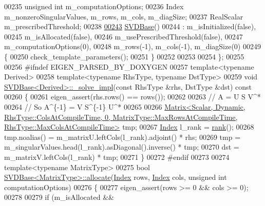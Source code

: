 \begin{DoxyCode}
00235   \textcolor{keywordtype}{unsigned} \textcolor{keywordtype}{int} m\_computationOptions;
00236   Index m\_nonzeroSingularValues, m\_rows, m\_cols, m\_diagSize;
00237   RealScalar m\_prescribedThreshold;
00238 
\hyperlink{group___s_v_d___module_abed06fc6f4b743e1f76a7b317539da87}{00243}   \hyperlink{group___s_v_d___module_abed06fc6f4b743e1f76a7b317539da87}{SVDBase}()
00244     : m\_isInitialized(false),
00245       m\_isAllocated(false),
00246       m\_usePrescribedThreshold(false),
00247       m\_computationOptions(0),
00248       m\_rows(-1), m\_cols(-1), m\_diagSize(0)
00249   \{
00250     check\_template\_parameters();
00251   \}
00252 
00253 
00254 \};
00255 
00256 \textcolor{preprocessor}{#ifndef EIGEN\_PARSED\_BY\_DOXYGEN}
00257 \textcolor{keyword}{template}<\textcolor{keyword}{typename} Derived>
00258 \textcolor{keyword}{template}<\textcolor{keyword}{typename} RhsType, \textcolor{keyword}{typename} DstType>
00259 \textcolor{keywordtype}{void} \hyperlink{group___s_v_d___module_class_eigen_1_1_s_v_d_base}{SVDBase<Derived>::\_solve\_impl}(\textcolor{keyword}{const} RhsType &rhs, DstType &dst)\textcolor{keyword}{ const}
00260 \textcolor{keyword}{}\{
00261   eigen\_assert(rhs.rows() == rows());
00262 
00263   \textcolor{comment}{// A = U S V^*}
00264   \textcolor{comment}{// So A^\{-1\} = V S^\{-1\} U^*}
00265 
00266   
      \hyperlink{group___core___module_class_eigen_1_1_matrix}{Matrix<Scalar, Dynamic, RhsType::ColsAtCompileTime, 0, MatrixType::MaxRowsAtCompileTime,
       RhsType::MaxColsAtCompileTime>}
       tmp;
00267   \hyperlink{group___s_v_d___module_a6229a37997eca1072b52cca5ee7a2bec}{Index} l\_rank = \hyperlink{group___s_v_d___module_a30b89e24f42f1692079eea31b361d26a}{rank}();
00268   tmp.noalias() =  m\_matrixU.leftCols(l\_rank).adjoint() * rhs;
00269   tmp = m\_singularValues.head(l\_rank).asDiagonal().inverse() * tmp;
00270   dst = m\_matrixV.leftCols(l\_rank) * tmp;
00271 \}
00272 \textcolor{preprocessor}{#endif}
00273 
00274 \textcolor{keyword}{template}<\textcolor{keyword}{typename} MatrixType>
00275 \textcolor{keywordtype}{bool} \hyperlink{group___s_v_d___module_class_eigen_1_1_s_v_d_base}{SVDBase<MatrixType>::allocate}(\hyperlink{group___s_v_d___module_a6229a37997eca1072b52cca5ee7a2bec}{Index} rows, 
      \hyperlink{group___s_v_d___module_a6229a37997eca1072b52cca5ee7a2bec}{Index} cols, \textcolor{keywordtype}{unsigned} \textcolor{keywordtype}{int} computationOptions)
00276 \{
00277   eigen\_assert(rows >= 0 && cols >= 0);
00278 
00279   \textcolor{keywordflow}{if} (m\_isAllocated &&

\end{DoxyCode}
